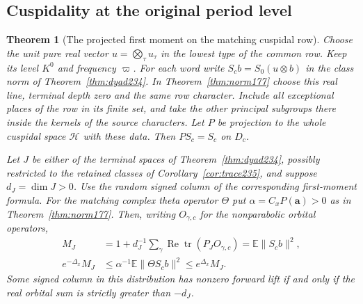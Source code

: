 \documentclass[a4paper,11pt]{article}
\newtheorem{theorem}[proposition]{Theorem}
\theoremstyle{definition}
\theoremstyle{remark}
\numberwithin{equation}{section}
\begin{document}
\subsection{Cuspidality at the original period level}\label{nav:VII-35}
\begin{theorem}[The projected first moment on the matching cuspidal row]
\label{thm:range239}
Choose the unit pure real vector \(u=\bigotimes_\tau u_\tau\)
in the lowest type of the common row. Keep its level \(K^0\) and
frequency \(\varpi\). For each word write \(S_cb=S_0(u\otimes b)\)
in the class norm of Theorem~\ref{thm:dyad234}. In
Theorem~\ref{thm:norm177} choose this real line, terminal depth
zero and the same row character. Include all exceptional places
of the row in its finite set, and take the other principal
subgroups there inside the kernels of the source characters.
Let \(P\) be projection to the whole cuspidal space
\(\mathcal H\) with these data. Then \(PS_c=S_c\) on \(D_c\).

Let \(J\) be either of the terminal spaces of
Theorem~\ref{thm:dyad234}, possibly restricted to the retained
classes of Corollary~\ref{cor:trace235}, and suppose \(d_J=\dim J>0\).
Use the random signed column of the corresponding first-moment
formula. For the matching complex theta operator \(\Theta\) put
\(\alpha=C_xP(\mathbf a)>0\) as in Theorem~\ref{thm:norm177}.
Then, writing \(O_{\gamma,c}\) for the nonparabolic orbital operators,
\[
 \begin{split}
 M_J&=1+d_J^{-1}\sum_\gamma
             \operatorname{Re}\operatorname{tr}(P_J O_{\gamma,c})
       =\mathbb E\|S_cb\|^2,\\
 e^{-\Delta_x}M_J&\le
      \alpha^{-1}\mathbb E\|\Theta S_cb\|^2\le e^{\Delta_x}M_J .
 \end{split}
\]
Some signed column in this distribution has nonzero forward
lift if and only if the real orbital sum is strictly greater than
\(-d_J\).
\end{theorem}
\end{document}
